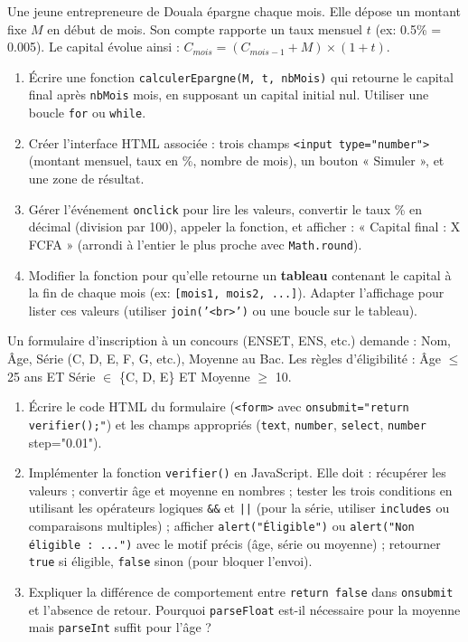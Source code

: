 \documentclass[11pt]{article}
\begin{document}
\begin{exercice}
Une jeune entrepreneure de Douala épargne chaque mois. Elle dépose un montant fixe $M$ en début de mois. Son compte rapporte un taux mensuel $t$ (ex: 0.5\% = 0.005). Le capital évolue ainsi : $C_{mois} = (C_{mois-1} + M) \times (1 + t)$.
\begin{enumerate}
    \item Écrire une fonction \texttt{calculerEpargne(M, t, nbMois)} qui retourne le capital final après \texttt{nbMois} mois, en supposant un capital initial nul. Utiliser une boucle \texttt{for} ou \texttt{while}.
    \item Créer l'interface HTML associée : trois champs \texttt{<input type="number">} (montant mensuel, taux en \%, nombre de mois), un bouton « Simuler », et une zone de résultat.
    \item Gérer l'événement \texttt{onclick} pour lire les valeurs, convertir le taux \% en décimal (division par 100), appeler la fonction, et afficher : « Capital final : X FCFA » (arrondi à l'entier le plus proche avec \texttt{Math.round}).
    \item Modifier la fonction pour qu'elle retourne un \textbf{tableau} contenant le capital à la fin de chaque mois (ex: \texttt{[mois1, mois2, ...]}). Adapter l'affichage pour lister ces valeurs (utiliser \texttt{join('<br>')} ou une boucle sur le tableau).
\end{enumerate}
\end{exercice}

\begin{exercice}
Un formulaire d'inscription à un concours (ENSET, ENS, etc.) demande : Nom, Âge, Série (C, D, E, F, G, etc.), Moyenne au Bac. Les règles d'éligibilité : Âge $\le$ 25 ans ET Série $\in$ \{C, D, E\} ET Moyenne $\ge$ 10.
\begin{enumerate}
    \item Écrire le code HTML du formulaire (\texttt{<form>} avec \texttt{onsubmit="return verifier();"}) et les champs appropriés (\texttt{text}, \texttt{number}, \texttt{select}, \texttt{number} step="0.01").
    \item Implémenter la fonction \texttt{verifier()} en JavaScript. Elle doit : récupérer les valeurs ; convertir âge et moyenne en nombres ; tester les trois conditions en utilisant les opérateurs logiques \texttt{\&\&} et \texttt{||} (pour la série, utiliser \texttt{includes} ou comparaisons multiples) ; afficher \texttt{alert("Éligible")} ou \texttt{alert("Non éligible : ...")} avec le motif précis (âge, série ou moyenne) ; retourner \texttt{true} si éligible, \texttt{false} sinon (pour bloquer l'envoi).
    \item Expliquer la différence de comportement entre \texttt{return false} dans \texttt{onsubmit} et l'absence de retour. Pourquoi \texttt{parseFloat} est-il nécessaire pour la moyenne mais \texttt{parseInt} suffit pour l'âge ?
\end{enumerate}
\end{exercice}
\end{document}
